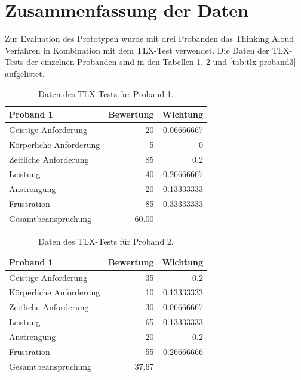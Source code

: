 \section{Zusammenfassung der Daten}

Zur Evaluation des Prototypen wurde mit drei Probanden das Thinking Aloud Verfahren in Kombination mit dem TLX-Test verwendet. Die Daten der TLX-Tests der einzelnen Probanden sind in den Tabellen \ref{tab:tlx-proband1}, \ref{tab:tlx-proband2} und \ref{tab:tlx-proband3} aufgelistet.

\begin{table}[htb]
    \caption{\label{tab:tlx-proband1}Daten des TLX-Tests für Proband 1.}
    \centering
    \begin{tabular}{l r r}
        Proband 1 & Bewertung & Wichtung \\
        \hline
        Geistige Anforderung & 20 & 0.06666667 \\
        Körperliche Anforderung & 5 & 0 \\
        Zeitliche Anforderung & 85 & 0.2 \\
        Leistung & 40 & 0.26666667 \\
        Anstrengung & 20 & 0.13333333 \\
        Frustration & 85 & 0.33333333 \\
        \hline
        Gesamtbeanspruchung & 60.00 & \\
    \end{tabular}
\end{table}

\begin{table}[htb]
    \caption{\label{tab:tlx-proband2}Daten des TLX-Tests für Proband 2.}
    \centering
    \begin{tabular}{l r r}
        Proband 1 & Bewertung & Wichtung \\
        \hline
        Geistige Anforderung & 35 & 0.2 \\
        Körperliche Anforderung & 10 & 0.13333333 \\
        Zeitliche Anforderung & 30 & 0.06666667 \\
        Leistung & 65 & 0.13333333 \\
        Anstrengung & 20 & 0.2 \\
        Frustration & 55 & 0.26666666 \\
        \hline
        Gesamtbeanspruchung & 37.67 & \\
    \end{tabular}
\end{table}

